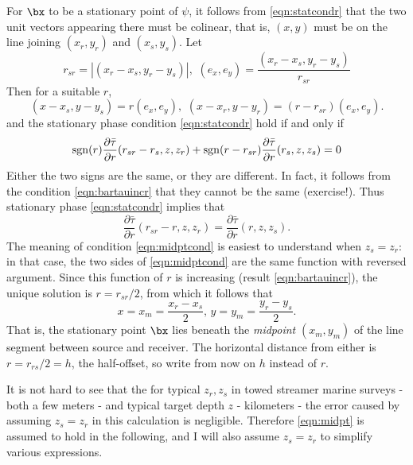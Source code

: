 For $\bx$ to be a stationary point of $\psi$, it follows from \ref{eqn:statcondr} that the two unit vectors appearing there must be colinear, that is, $(x,y)$ must be on the line joining $(x_r,y_r)$ and $(x_s,y_s)$. Let 
\[
r_{sr} = |(x_r-x_s,y_r-y_s)|, \,\, (e_x,e_y) = \frac{(x_r-x_s,y_r-y_s)}{r_{sr}}
\]
Then for a suitable $r$,
\[
(x-x_s,y-y_s) = r(e_x,e_y), \,\,(x-x_r, y-y_r) = (r-r_{sr})(e_x,e_y).
\]
 and the stationary phase condition \ref{eqn:statcondr} hold if and  only if
\[
{\rm sgn}(r)\frac{\partial \bar{\tau}}{\partial r}(r_{sr}-r_s,z,z_r) + {\rm sgn}(r-r_{sr})\frac{\partial \bar{\tau}}{\partial r}(r_s,z,z_s) = 0
\] 
Either the two signs are the same, or they are different. In fact, it follows from the condition \ref{eqn:bartauincr} that they cannot be the same (exercise!). Thus stationary phase \ref{eqn:statcondr} implies that 
\begin{equation}
\label{eqn:midptcond}
\frac{\partial \bar{\tau}}{\partial r}(r_{sr}-r,z,z_r) = \frac{\partial \bar{\tau}}{\partial r}(r,z,z_s).
\end{equation}
The meaning of condition \ref{eqn:midptcond} is easiest to understand when $z_s=z_r$: in that case, the two sides of \ref{eqn:midptcond} are the same function with reversed argument. Since this function of $r$ is increasing (result \ref{eqn:bartauincr}), the unique solution is $r=r_{sr}/2$, from which it follows that 
\begin{equation}
\label{eqn:midpt}
x = x_m = \frac{x_r-x_s}{2}, \, y=y_m=\frac{y_r-y_s}{2}.
\end{equation}
That is, the stationary point $\bx$ lies beneath the {\em midpoint} $(x_m,y_m)$ of the line segment between source and receiver. The horizontal distance from either is $r=r_{rs}/2 = h$, the half-offset, so write from now on $h$ instead of $r$.

It is not hard to see that the for typical $z_r,z_s$ in towed streamer marine surveys - both a few meters - and typical target depth $z$ - kilometers - the error caused by assuming $z_s=z_r$ in this calculation is negligible. Therefore \ref{eqn:midpt} is assumed to hold in the following, and I will also assume $z_s=z_r$ to simplify various expressions.

